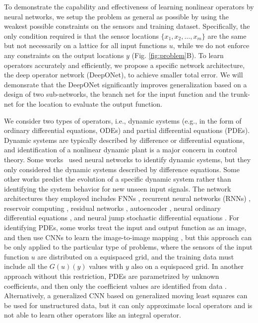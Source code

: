 \documentclass[11pt]{article}
\begin{document}
To demonstrate the capability and effectiveness of learning nonlinear operators by neural networks, we setup the problem as general as possible by using the weakest possible constraints on the sensors and training dataset. Specifically, the only condition required is that the sensor locations $\{x_1, x_2, \dots, x_m\}$ are the same but not necessarily on a lattice for all input functions $u$, while we do not enforce any constraints on the output locations $y$ (Fig. \ref{fig:problem}B). To learn operators accurately and efficiently, we propose a specific network architecture, the deep operator network (DeepONet), to achieve smaller total error. We will demonsrate that the DeepONet significantly improves generalization based on a design of two sub-networks, the branch net for the input function and the trunk-net for the location to evaluate the output function.

We consider two types of operators, i.e., dynamic systems (e.g., in the form of ordinary differential equations, ODEs) and partial differential equations (PDEs). Dynamic systems are typically described by difference or differential equations, and identification of a nonlinear dynamic plant is a major concern in control theory. Some works~\cite{patra1999identification,zhao2009nonlinear} used neural networks to identify dynamic systems, but they only considered the dynamic systems described by difference equations. Some other works \cite{neofotistos2018machine,raissi2018multistep,qin2019data,erichson2019physics} predict the evolution of a specific dynamic system rather than identifying the system behavior for new unseen input signals. The network architectures they employed includes FNNs \cite{raissi2018multistep}, recurrent neural networks (RNNs) \cite{neofotistos2018machine}, reservoir computing \cite{neofotistos2018machine}, residual networks \cite{qin2019data}, autoencoder \cite{erichson2019physics}, neural ordinary differential equations \cite{chen2018neural}, and neural jump stochastic differential equations \cite{jia2019neural}. For identifying PDEs, some works treat the input and output function as an image, and then use CNNs to learn the image-to-image mapping \cite{winovich2019convpde,zhu2019physics}, but this approach can be only applied to the particular type of problems, where the sensors of the input function $u$ are distributed on a equispaced grid, and the training data must include all the $G(u)(y)$ values with $y$ also on a equispaced grid. In another approach without this restriction, PDEs are parametrized by unknown coefficients, and then only the coefficient values are identified from data \cite{brunton2016discovering,rudy2017data,zhang2019quantifying,pang2019fpinns,lu2019deepxde}. Alternatively, a generalized CNN based on generalized moving least squares \cite{trask2019gmls} can be used for unstructured data, but it can only approximate local operators and is not able to learn other operators like an integral operator.
\end{document}
